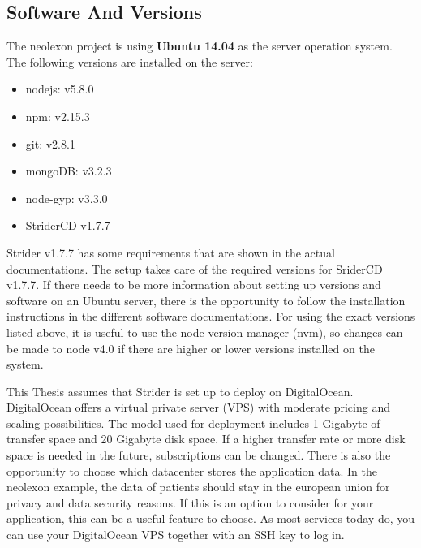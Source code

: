 \subsection{Software And Versions}
The neolexon project is using \textbf{Ubuntu 14.04} as the server operation system. The following versions are installed on the server:
\begin{itemize}
  \item nodejs: v5.8.0
  \item npm: v2.15.3
  \item git: v2.8.1
  \item mongoDB: v3.2.3
  \item node-gyp: v3.3.0
  \item StriderCD v1.7.7
\end{itemize}

Strider v1.7.7 has some requirements that are shown in the actual documentations. The setup takes care of the required versions for SriderCD v1.7.7.
If there needs to be more information about setting up versions and software on an Ubuntu server, there is the opportunity to follow the installation instructions
in the different software documentations. For using the exact versions listed above, it is useful to use the node version manager (nvm), so changes can be
made to node v4.0 if there are higher or lower versions installed on the system.

This Thesis assumes that Strider is set up to deploy on DigitalOcean. DigitalOcean offers a virtual private server (VPS) with moderate pricing and scaling
possibilities. The model used for deployment includes 1 Gigabyte of transfer space and 20 Gigabyte disk space. If a higher transfer rate or more disk space
is needed in the future, subscriptions can be changed. There is also the opportunity to choose which datacenter stores the application data. In the neolexon example,
the data of patients should stay in the european union for privacy and data security reasons. If this is an option to consider for your application, this can be a useful
feature to choose. As most services today do, you can use your DigitalOcean VPS together with an SSH key to log in.


